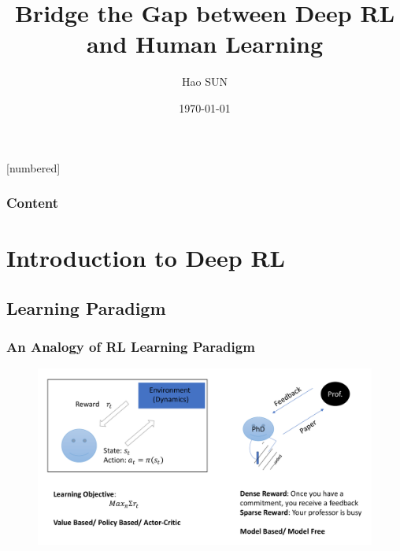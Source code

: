 \documentclass[10pt,hyperref={CJKbookmarks=true},envcountsect,mathserif]{beamer}
\begin{document}
[numbered]
\newcommand{\myarray}[2]{$#1_1,#1_2,\dots,#1_#2$}




\title{Bridge the Gap between Deep RL and Human Learning}
\author[Hao SUN]{Hao SUN\inst{*}}



\date{\today}

\begin{frame}
\titlepage
\end{frame}

\begin{frame}
\frametitle{Content}
\tableofcontents	
\end{frame}



\section{Introduction to Deep RL}
\subsection{Learning Paradigm}
\begin{frame}
\frametitle{An Analogy of RL Learning Paradigm}	
\begin{figure}
\centering
\includegraphics[width=1.0\linewidth]{figures/Prof.pdf}
\end{figure}
\end{frame}
\end{document}
